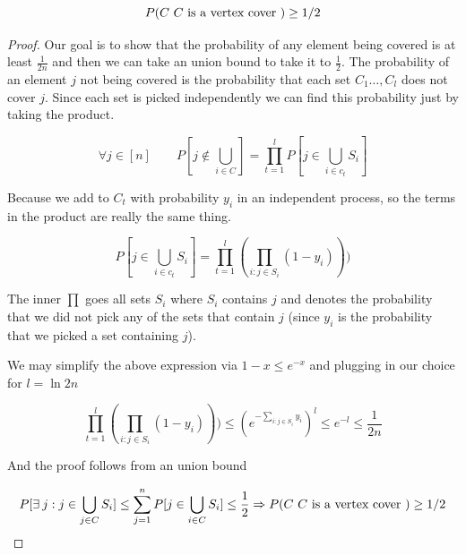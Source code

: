 \documentclass[../notes.tex]{subfiles}
\begin{document}
\begin{lemma}
\begin{equation}
    P(C \text{ $ C $ is a vertex cover }) \ge  1/2
\end{equation}

\begin{proof}


Our goal is to show that the probability of any element being covered is at least $ \frac{1}{2n} $ and then we can take an union bound to take it to $ \frac{1}{2} $.
The probability of an element $ j $ not being covered is the probability that each set $ C_1 \ldots, C_l$ does not cover $ j $. Since each set is picked independently we can find this probability just by taking the product.

\begin{equation}
    \forall j \in [n] \qquad P[j \notin \bigcup_{i \in C }] = \prod_{t=1}^{l} P[j \in \bigcup_{i \in c_t} S_i ]
\end{equation}

Because we add to $ C_t $ with probability $ y_i $ in an independent process, so the terms in the product are really the same thing.

\begin{equation}
    P[j \in \bigcup_{i \in c_t} S_i ] = \prod_{t=1}^l (\prod_{i: j \in S_i} (1-y_i)))
\end{equation}

The inner $ \prod $ goes all sets $ S_i $ where $ S_i $ contains $ j $ and denotes the probability that we did not pick any of the sets that contain $ j $ (since $ y_i $ is the probability that we picked a set containing $ j $).

We may simplify the above expression via $ 1-x \le  e ^{-x} $ and plugging in our choice for $ l = \ln 2n $


\begin{equation}
    \prod_{t=1}^l (\prod_{i: j \in S_i} (1-y_i))) \le  (e ^{- \sum_{i: j\in S_i} y_i})^l \le  e^{-l} \le  \frac{1}{2n}
\end{equation}

And the proof follows from an union bound




\begin{equation}
    P[\exists j : j \in \bigcup_{j \in C} S_i] \le  \sum_{j=1}^n P[j \in \bigcup_{i\in C} S_i] \le \frac{1}{2} \Rightarrow P(C \text{ $ C $ is a vertex cover }) \ge  1/2
\end{equation}





\end{proof}


\end{lemma}
\end{document}
